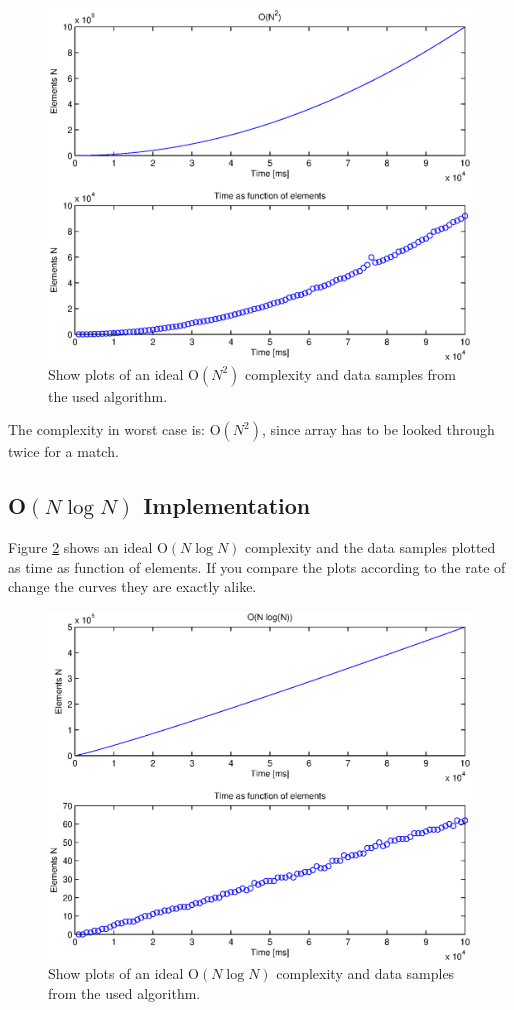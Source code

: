 \begin{figure}[th!]
\centering
\includegraphics[width=1\textwidth]{./graphics/test1.eps}
\caption{Show plots of an ideal O\(\left( { N }^{ 2 } \right)\) complexity and data samples from the used algorithm.}
\label{fig:test1}
\end{figure}

The complexity in worst case is: O\(\left( { N }^{ 2 } \right)\), since array has to be looked through twice for a match. 


\newpage
\subsection{O\(\left( N\log {N }  \right) \) Implementation}
Figure \ref{fig:test2} shows an ideal O\(\left( N\log {N }  \right) \) complexity and the data samples plotted as time as function of elements. If you compare the plots according to the rate of change the curves they are exactly alike. 
\begin{figure}[th!]
\centering
\includegraphics[width=1\textwidth]{./graphics/test2.eps}
\caption{Show plots of an ideal O\(\left( N\log {N }  \right) \) complexity and data samples from the used algorithm.}
\label{fig:test2}
\end{figure}

